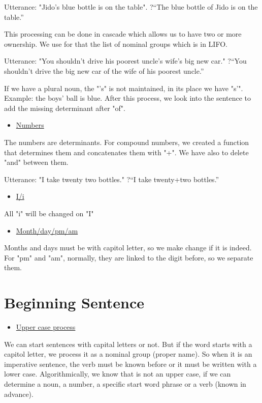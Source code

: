 \documentclass[twoside,a4paper,10pt]{report}
\newcommand{\dokutitleleveltree}[1]{\section{#1}}
\newcommand{\dokuunderline}[1]{\underline{#1}}
\newcommand{\dokuitem}{\item}
\begin{document}
\small
\begin{verbatimtab}
  Utterance: "Jido's blue bottle is on the table". 
  ?“The blue bottle of Jido is on the table.” 
\end{verbatimtab}
\normalsize
This processing can be done in cascade which allows us to have two or more ownership. We use for that the list of nominal groups which is in LIFO.


\small
\begin{verbatimtab}
  Utterance: "You shouldn't drive his poorest uncle's wife's big new car." 
  ?“You shouldn’t drive the big new car of the wife of his poorest uncle.”
\end{verbatimtab}
\normalsize
If we have a plural noun, the "’s" is not maintained, in its place we have "s’".
Example: the boys' ball is blue.
After this process, we look into the sentence to add the missing determinant after "of".



\begin{itemize}
\dokuitem  \dokuunderline{Numbers}
\end{itemize}
The numbers are determinants. For compound numbers, we created a function that determines them and concatenates them with "+". We have also to delete "and" between them.


\small
\begin{verbatimtab}
  Utterance: "I take twenty two bottles."
  ?“I take twenty+two bottles.”
\end{verbatimtab}
\normalsize

\begin{itemize}
\dokuitem  \dokuunderline{I/i}
\end{itemize}
All "i" will be changed on "I"



\begin{itemize}
\dokuitem  \dokuunderline{Month/day/pm/am}
\end{itemize}
Months and days must be with capitol letter, so we make change if it is indeed. For "pm" and "am", normally, they are linked to the digit before, so we separate them.


\dokutitleleveltree{Beginning Sentence}
\label{194989f378cb64e64758160f2e624d3f}%

\begin{itemize}
\dokuitem  \dokuunderline{Upper case process}
\end{itemize}
We can start sentences with capital letters or not. But if the word starts with a capitol letter, we process it as a nominal group (proper name). So when it is an imperative sentence, the verb must be known before or it must be written with a lower case.
Algorithmically, we know that is not an upper case, if we can determine a noun, a number, a specific start word phrase or a verb (known in advance).
\end{document}
